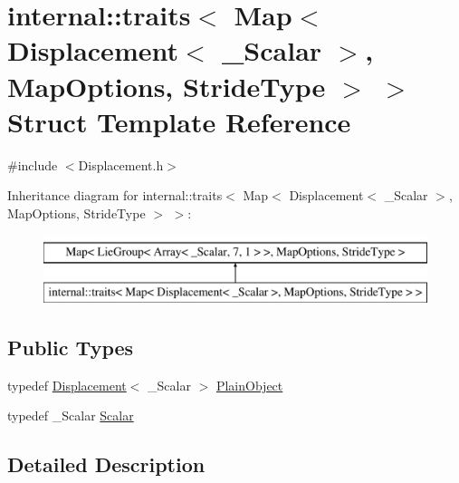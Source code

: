 \hypertarget{structinternal_1_1traits_3_01_map_3_01_displacement_3_01___scalar_01_4_00_01_map_options_00_01_stride_type_01_4_01_4}{}\section{internal\+:\+:traits$<$ Map$<$ Displacement$<$ \+\_\+\+Scalar $>$, Map\+Options, Stride\+Type $>$ $>$ Struct Template Reference}
\label{structinternal_1_1traits_3_01_map_3_01_displacement_3_01___scalar_01_4_00_01_map_options_00_01_stride_type_01_4_01_4}


{\ttfamily \#include $<$Displacement.\+h$>$}

Inheritance diagram for internal\+:\+:traits$<$ Map$<$ Displacement$<$ \+\_\+\+Scalar $>$, Map\+Options, Stride\+Type $>$ $>$\+:\begin{figure}[H]
\begin{center}
\leavevmode
\includegraphics[height=2.000000cm]{structinternal_1_1traits_3_01_map_3_01_displacement_3_01___scalar_01_4_00_01_map_options_00_01_stride_type_01_4_01_4}
\end{center}
\end{figure}
\subsection*{Public Types}
\begin{DoxyCompactItemize}
\item 
typedef \hyperlink{class_displacement}{Displacement}$<$ \+\_\+\+Scalar $>$ \hyperlink{structinternal_1_1traits_3_01_map_3_01_displacement_3_01___scalar_01_4_00_01_map_options_00_01_stride_type_01_4_01_4_a731702958c8fe6e17c7ecfa15d75e5d0}{Plain\+Object}
\item 
typedef \+\_\+\+Scalar \hyperlink{structinternal_1_1traits_3_01_map_3_01_displacement_3_01___scalar_01_4_00_01_map_options_00_01_stride_type_01_4_01_4_af622b2eb414fa4600a591d0b6ae51f8d}{Scalar}
\end{DoxyCompactItemize}


\subsection{Detailed Description}
